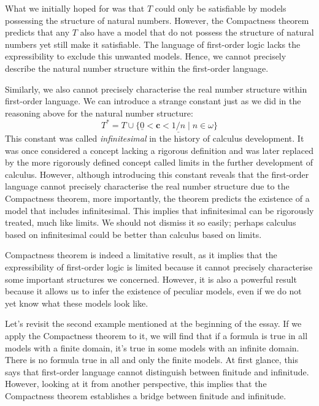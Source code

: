 What we initially hoped for was that $T$ could only be satisfiable by models possessing the structure of natural numbers. However, the Compactness theorem predicts that any $T$ also have a model that do not possess the structure of natural numbers yet still make it satisfiable. The language of first-order logic lacks the expressibility to exclude this unwanted models. Hence, we cannot precisely describe the natural number structure within the first-order language.

Similarly, we also cannot precisely characterise the real number structure within first-order language. We can introduce a strange constant just as we did in the reasoning above for the natural number structure:
\begin{equation*}
   T^* = T \cup \{ \underline{0} < \mathbf{c} < \underline{1/n} \mid n \in \omega \}
\end{equation*}
This constant was called \textit{infinitesimal} in the history of calculus development. It was once considered a concept lacking a rigorous definition and was later replaced by the more rigorously defined concept called limits in the further development of calculus. However, although introducing this constant reveals that the first-order language cannot precisely characterise the real number structure due to the Compactness theorem, more importantly, the theorem predicts the existence of a model that includes infinitesimal. This implies that infinitesimal can be rigorously treated, much like limits. We should not dismiss it so easily; perhaps calculus based on infinitesimal could be better than calculus based on limits.

Compactness theorem is indeed a limitative result, as it implies that the expressibility of first-order logic is limited because it cannot precisely characterise some important structures we concerned. However, it is also a powerful result because it allows us to infer the existence of peculiar models, even if we do not yet know what these models look like. 

Let's revisit the second example mentioned at the beginning of the essay. If we apply the Compactness theorem to it, we will find that if a formula is true in all models with a finite domain, it's true in some models with an infinite domain. There is no formula true in all and only the finite models. At first glance, this says that first-order language cannot distinguish between finitude and infinitude. However, looking at it from another perspective, this implies that the Compactness theorem establishes a bridge between finitude and infinitude.

